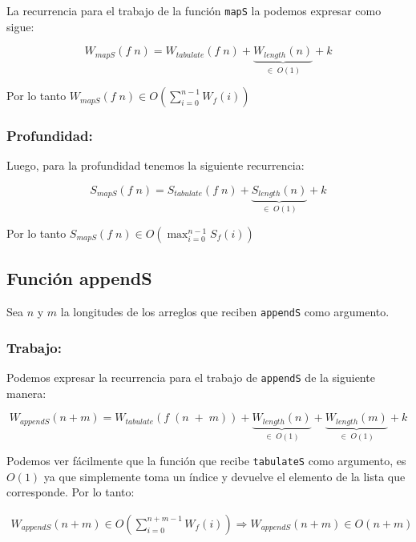 \documentclass[11pt]{article}
\begin{document}
La recurrencia para el trabajo de la función \texttt{mapS} la podemos
expresar como sigue:

\begin{equation*}
    W_{mapS}(f \; n) = W_{tabulate}(f \; n) + \underbrace{W_{length}(n)}_{\in \; O(1)} + k
\end{equation*} 

Por lo tanto $ W_{mapS}(f \; n) \in O\left(\displaystyle\sum_{i=0}^{n - 1}W_f(i)\right) $

\subsubsection{Profundidad:}

Luego, para la profundidad tenemos la siguiente recurrencia:

\begin{equation*}
    S_{mapS}(f \; n) = S_{tabulate}(f \; n) + \underbrace{S_{length}(n)}_{\in \; O(1)} + k
\end{equation*} 

Por lo tanto $ S_{mapS}(f \; n) \in O\left(\displaystyle\max_{i=0}^{n - 1}S_f(i)\right) $


\subsection{Función appendS}
Sea $n$ y $m$ la longitudes de los arreglos que reciben \texttt{appendS} como
argumento. 
\subsubsection{Trabajo:}

Podemos expresar la recurrencia para el trabajo de \texttt{appendS} de 
la siguiente manera:

\begin{equation*}
    W_{appendS}(n + m) = W_{tabulate}(f \; (n \; +\; m)) + \underbrace{W_{length}(n)}_{\in \; O(1)}
    + \underbrace{W_{length}(m)}_{\in \; O(1)} + k
\end{equation*}

Podemos ver fácilmente que la función que recibe \texttt{tabulateS} como
argumento, es $O(1)$ ya que simplemente toma un índice y devuelve el 
elemento de la lista que corresponde. Por lo tanto:

\begin{align*}
    W_{appendS}(n + m) \in O\left(\displaystyle\sum_{i=0}^{n + m - 1}W_f(i)\right)
    \Rightarrow W_{appendS}(n + m) \in O(n + m)
\end{align*}
\end{document}
